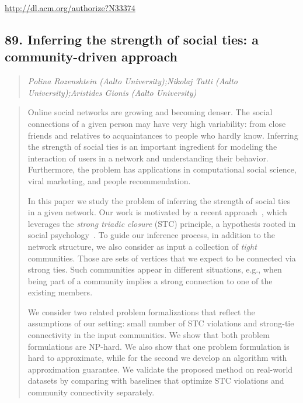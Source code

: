 \documentclass{article}
\begin{document}
\href{http://dl.acm.org/authorize?N33374}{http://dl.acm.org/authorize?N33374}

\subsection{89. Inferring the strength of social ties: a community-driven approach}

\begin{quote}
\footnotesize{\textit{Polina Rozenshtein (Aalto University);Nikolaj Tatti (Aalto University);Aristides Gionis (Aalto University)}}

\end{quote}

\begin{quote}
Online social networks are growing and becoming denser. The social connections of a given person may have very high variability: from close friends and relatives to acquaintances to people who hardly know. Inferring the strength of social ties is an important ingredient for modeling the interaction of users in a network and understanding their behavior. Furthermore, the problem has applications in computational social science, viral marketing, and people recommendation.







  In this paper we study the problem of inferring the strength of social ties in a given network. Our work is motivated by a recent approach~\cite{sintos2014using}, which leverages the {\em strong triadic closure} (STC) principle, a hypothesis rooted in social psychology~\cite{granovetter1973strength}. To guide our inference process, in addition to the network structure, we also consider as input a collection of {\em tight} communities. Those are sets of vertices that we expect to be connected via strong ties. Such communities appear in different situations, e.g., when being part of a community implies a strong connection to one of the existing members.







  We consider two related problem formalizations that reflect the assumptions of our setting: small number of STC violations and strong-tie connectivity in the input communities. We show that both problem formulations are NP-hard. We also show that one problem formulation is hard to approximate, while for the second we develop an algorithm with approximation guarantee. We validate the proposed method on real-world datasets by comparing with baselines that optimize STC violations and community connectivity separately.
\end{quote}
\end{document}
